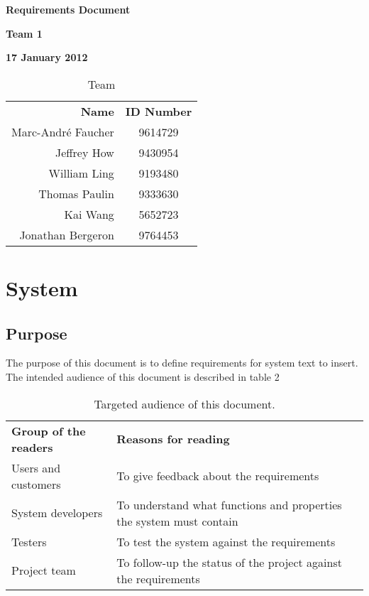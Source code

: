 \documentclass[12pt]{article}
\newcommand{\systemName}{text to insert}
\begin{document}
\vspace*{0.5in}
\centerline{\bf\Large Requirements Document}

\vspace*{0.5in}
\centerline{\bf\Large Team 1}

\vspace*{0.5in}
\centerline{\bf\Large 17 January 2012}

\vspace*{1.5in}
\begin{table}[htbp]
\caption{Team}
\begin{center}
\begin{tabular}{|r | c|}
\hline
{\bf Name} & {\bf ID Number} \\
Marc-Andr\'{e} Faucher & 9614729 \\
Jeffrey How & 9430954 \\
William Ling & 9193480 \\
Thomas Paulin & 9333630 \\
Kai Wang & 5652723 \\
Jonathan Bergeron & 9764453 \\
\hline
\end{tabular}
\end{center}
\end{table}

\clearpage

\section{System}

\subsection{Purpose}
The purpose of this document is to define requirements for system \systemName.
\newline\newline
The intended audience of this document is described in table 2
\newline
\begin{table}[htbp]
\caption{Targeted audience of this document.}
\begin{center}
\begin{tabular}{|l | l|}
\hline
{\bf Group of the readers} & {\bf Reasons for reading}\\ \cline{1-2}
Users and customers & To give feedback about the requirements\\ \cline{1-2}
System developers & To understand what functions and properties the system must contain\\ \cline{1-2}
Testers & To test the system against the requirements\\ \cline{1-2}
Project team & To follow-up the status of the project against the requirements\\ \cline{1-2}
\hline
\end{tabular}
\end{center}
\end{table}
\end{document}
